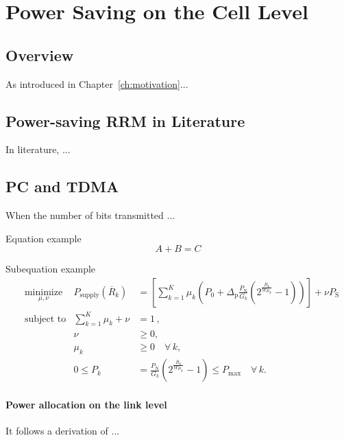 \chapter{Power Saving on the Cell Level}
\label{ch:cell}

\section{Overview}
As introduced in Chapter~\ref{ch:motivation}...

\section{Power-saving \ac{RRM} in Literature}
\label{ch4:literature}
In literature, ...

\section{\ac{PC} and \acs{TDMA}}
\label{ch4:pctdma}

When the number of bits transmitted ...

Equation example
\begin{equation}
  A + B = C
 \label{eq:OP}
\end{equation}

Subequation example
\begin{subequations}
\begin{align}
& \underset{\mu, \nu}{\text{minimize}} 		& 	P_{\mathrm{supply}}(\overline{R}_k) 	&=  \left[ \sum_{k=1}^{K} \mu_k \left( P_0 + \Delta_{\mathrm{p}} \frac{P_{\mathrm{N}}}{G_k} \left( 2^\frac{\overline{R}_k}{W \mu_k} - 1 \right) \right) \right] + \nu P_{\mathrm{S}} \\
& \text{subject to} 				& 	 \sum_{k=1}^{K} \mu_k + \nu &= 1 \,,\label{eq:OPnumu} \\
& 						&	\nu 						&\ge 0,\label{eq:OPnu}\\
&						&	\mu_k 						&\ge 0 \quad \forall\,k, \label{eq:OPmu}\\
&						&	 0 \leq P_k 					&= \frac{P_{\mathrm{N}}}{G_k} \left( 2^{\frac{\overline{R}_k}{W \mu_k}} - 1 \right) \leq P_{\mathrm{max}} \quad \forall\,k.\label{eq:OPpmax}%
\end{align}%
\label{eq:OPJSAC}%
\end{subequations}%


\subsubsection{Power allocation on the link level}
It follows a derivation of ...

